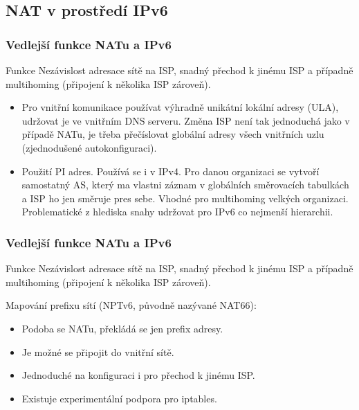 \documentclass{beamer}
\begin{document}
\subsection{NAT v prostředí IPv6}
\begin{frame} \frametitle{Vedlejší funkce NATu a IPv6}

\begin{block}{Funkce}
Nezávislost adresace sítě na ISP, snadný přechod k jinému ISP a případně multihoming (připojení k několika ISP zároveň).
\end{block}

\begin{itemize}
\item Pro vnitřní komunikace používat výhradně unikátní lokální adresy (ULA), udržovat je ve vnitřním DNS serveru.
      Změna ISP není tak jednoduchá jako v případě NATu, je třeba přečíslovat globální adresy všech vnitřních uzlu (zjednodušené autokonfiguraci).
\pause
\item Použití PI adres.
      Používá se i v IPv4. Pro danou organizaci se vytvoří samostatný AS, který ma vlastni záznam v globálních směrovacích tabulkách a ISP ho jen směruje pres sebe.
      Vhodné pro multihoming velkých organizaci.
      Problematické z hlediska snahy udržovat pro IPv6 co nejmenší hierarchii.

\end{itemize}
\end{frame}

\begin{frame} \frametitle{Vedlejší funkce NATu a IPv6}

\begin{block}{Funkce}
Nezávislost adresace sítě na ISP, snadný přechod k jinému ISP a případně multihoming (připojení k několika ISP zároveň).
\end{block}

Mapování prefixu sítí (NPTv6, původně nazývané NAT66):
\begin{itemize}
\item Podoba se NATu, překládá se jen prefix adresy.
\item Je možné se připojit do vnitřní sítě.
\item Jednoduché na konfiguraci i pro přechod k jinému ISP.  
\item Existuje experimentální podpora pro iptables.
\end{itemize}

\end{frame}
\end{document}
